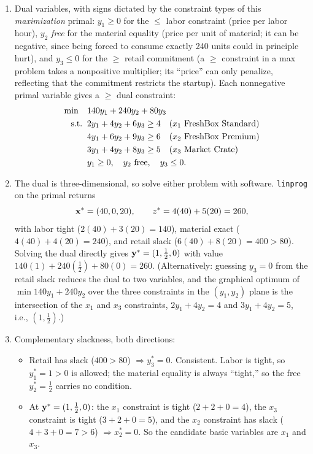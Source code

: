\begin{enumerate}
\item Dual variables, with signs dictated by the constraint types of this \emph{maximization} primal: $y_1 \ge 0$ for the $\leq$ labor constraint (price per labor hour), $y_2$ \emph{free} for the material equality (price per unit of material; it can be negative, since being forced to consume exactly 240 units could in principle hurt), and $y_3 \le 0$ for the $\geq$ retail commitment (a $\geq$ constraint in a max problem takes a nonpositive multiplier; its ``price'' can only penalize, reflecting that the commitment restricts the startup). Each nonnegative primal variable gives a $\geq$ dual constraint:
\[
\begin{aligned}
\min \quad & 140y_1 + 240y_2 + 80y_3 \\
\text{s.t.}\;\; & 2y_1 + 4y_2 + 6y_3 \ge 4 \quad (x_1 \text{ FreshBox Standard}) \\
& 4y_1 + 6y_2 + 9y_3 \ge 6 \quad (x_2 \text{ FreshBox Premium}) \\
& 3y_1 + 4y_2 + 8y_3 \ge 5 \quad (x_3 \text{ Market Crate}) \\
& y_1 \ge 0, \quad y_2 \text{ free}, \quad y_3 \le 0 .
\end{aligned}
\]
\item The dual is three-dimensional, so solve either problem with software. \texttt{linprog} on the primal returns
\[
\mathbf{x}^* = (40, 0, 20), \qquad z^* = 4(40) + 5(20) = 260,
\]
with labor tight ($2(40) + 3(20) = 140$), material exact ($4(40) + 4(20) = 240$), and retail slack ($6(40) + 8(20) = 400 > 80$). Solving the dual directly gives $\mathbf{y}^* = (1, \tfrac12, 0)$ with value $140(1) + 240(\tfrac12) + 80(0) = 260$. (Alternatively: guessing $y_3 = 0$ from the retail slack reduces the dual to two variables, and the graphical optimum of $\min 140y_1 + 240y_2$ over the three constraints in the $(y_1, y_2)$ plane is the intersection of the $x_1$ and $x_3$ constraints, $2y_1 + 4y_2 = 4$ and $3y_1 + 4y_2 = 5$, i.e., $(1, \tfrac12)$.)
\item Complementary slackness, both directions:
\begin{itemize}
\item Retail has slack ($400 > 80$) $\Rightarrow y_3^* = 0$. Consistent. Labor is tight, so $y_1^* = 1 > 0$ is allowed; the material equality is always ``tight,'' so the free $y_2^* = \tfrac12$ carries no condition.
\item At $\mathbf{y}^* = (1, \tfrac12, 0)$: the $x_1$ constraint is tight ($2 + 2 + 0 = 4$), the $x_3$ constraint is tight ($3 + 2 + 0 = 5$), and the $x_2$ constraint has slack ($4 + 3 + 0 = 7 > 6$) $\Rightarrow x_2^* = 0$. So the candidate basic variables are $x_1$ and $x_3$.

\end{itemize}
\end{enumerate}
